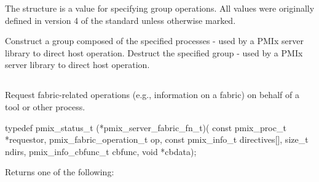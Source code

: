 The  structure is a  value for specifying group operations. All values were originally defined in version 4 of the standard unless otherwise marked.

\begin{constantdesc}
%
Construct a group composed of the specified processes - used by a \ac{PMIx} server library to direct host operation.
%
Destruct the specified group - used by a \ac{PMIx} server library to direct host operation.
%
\end{constantdesc}


\subsection{}

\summary

Request fabric-related operations (e.g., information on a fabric) on behalf of a tool or other process.

\format

\cspecificstart
\begin{codepar}
typedef pmix_status_t (*pmix_server_fabric_fn_t)(
                           const pmix_proc_t *requestor,
                           pmix_fabric_operation_t op,
                           const pmix_info_t directives[],
                           size_t ndirs,
                           pmix_info_cbfunc_t cbfunc,
                           void *cbdata);
\end{codepar}
\cspecificend

\begin{arglist}
\end{arglist}

Returns one of the following:

